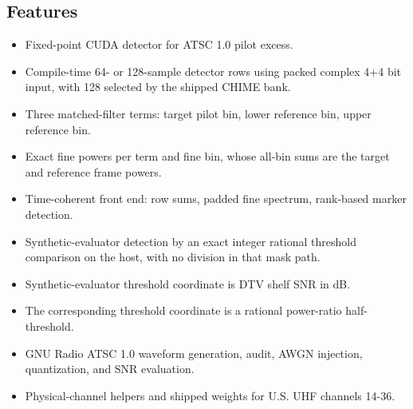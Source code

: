 \documentclass[10pt,letterpaper]{article}
\newcommand{\code}[1]{\texttt{\detokenize{#1}}}
\begin{document}
\begin{minipage}[t]{0.48\textwidth}
\subsection*{Features}
\begin{itemize}
  \item Fixed-point CUDA detector for ATSC 1.0 pilot excess.
  \item Compile-time 64- or 128-sample detector rows using packed complex
        4+4 bit input, with 128 selected by the shipped CHIME bank.
  \item Three matched-filter terms: target pilot bin, lower reference bin, upper reference bin.
  \item Exact \code{uint64} fine powers per term and fine bin, whose all-bin sums are the target and reference frame powers.
  \item Time-coherent front end: \code{int32} row sums, padded fine
        spectrum, rank-based marker detection.
  \item Synthetic-evaluator detection by an exact integer rational threshold comparison on the host, with no division in that mask path.
  \item Synthetic-evaluator threshold coordinate is DTV shelf SNR in dB.
  \item The corresponding threshold coordinate is a rational power-ratio half-threshold.
  \item GNU Radio ATSC 1.0 waveform generation, audit, AWGN injection, quantization, and SNR evaluation.
  \item Physical-channel helpers and shipped weights for U.S. UHF channels 14-36.
\end{itemize}
\end{minipage}
\hfill
\end{document}
